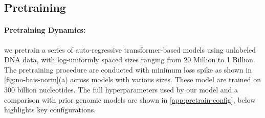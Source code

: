 \subsection{Pretraining}
 
\label{sec:pretraining}
\paragraph{Pretraining Dynamics:} we pretrain a series of auto-regressive transformer-based models using unlabeled DNA data, with log-uniformly spaced sizes ranging from 20 Million to 1 Billion. The pretraining procedure are conducted with minimum loss spike as shown in \cref{fig:no-bais-norm}(a) across models with various sizes. These model are trained on 300 billion nucleotides. The full hyperparameters used by our model and a comparison with prior genomic models are shown in \cref{app:pretrain-config}, below highlights key configurations.

 
